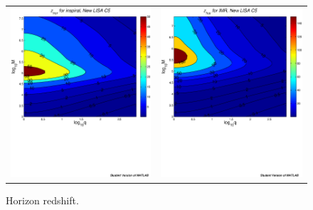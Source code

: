 \documentclass{iopart}
\begin{document}
\begin{figure}[H]
\begin{center}
\begin{tabular}{cc}
\includegraphics[scale=0.41,clip=true]{FigEmanuele/C5InspZhorContour.ps}
&\includegraphics[scale=0.41,clip=true]{FigEmanuele/C5IMRZhorContour.ps}\\
\end{tabular}
\caption{\label{fig:SNRMiniLISA5} Horizon redshift.}
\end{center}
\end{figure}
%
\end{document}
